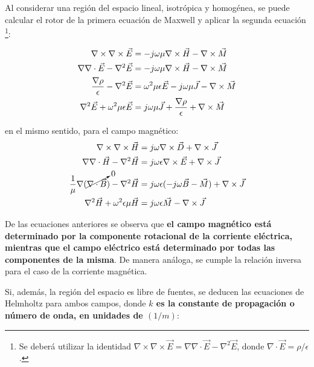 Al considerar una región del espacio lineal, isotrópica y homogénea, se puede calcular el rotor de la primera ecuación de Maxwell y aplicar la segunda ecuación \footnote{Se deberá utilizar la identidad $\nabla \times \nabla \times \vec{E} = \nabla \nabla \cdot \vec{E} - \nabla^2\vec{E}$, donde $\nabla \cdot \vec{E} = \rho/\epsilon$.}:

\begin{align}
	\nabla \times \nabla \times \vec{E} & = -j \omega \mu \nabla \times \vec{H} - \nabla \times \vec{M} \notag \\
	\nabla \nabla \cdot \vec{E} - \nabla^2 \vec{E} & = -j \omega \mu \nabla \times \vec{H} - \nabla \times \vec{M} \notag \\
	\frac{\nabla \rho}{\epsilon} - \nabla^2 \vec{E} & = \omega^2 \mu \epsilon \vec{E} - j \omega \mu \vec{J} - \nabla \times \vec{M} \notag\\
	\nabla^2 \vec{E} + \omega^2 \mu \epsilon \vec{E} & = j \omega \mu \vec{J} + \frac{\nabla \rho}{\epsilon} + \nabla \times \vec{M}
	\label{eq:eq_ondas_completa_E}
\end{align}

en el mismo sentido, para el campo magnético:
\begin{align}
	\nabla \times \nabla \times \vec{H} & = j \omega \nabla \times \vec{D} +  \nabla \times \vec{J} \notag \\
	\nabla \nabla \cdot \vec{H} - \nabla^2 \vec{H} & = j \omega \epsilon \nabla \times \vec{E} + \nabla \times \vec{J} \notag \\
	\frac{1}{\mu} \nabla (\cancelto{0}{\nabla \cdot \vec{B}}) - \nabla^2 \vec{H} & = j \omega \epsilon (-j \omega \vec{B} - \vec{M}) + \nabla \times \vec{J} \notag \\
	\nabla^2 \vec{H} + \omega^2 \epsilon \mu \vec{H} & =  j \omega \epsilon \vec{M} - \nabla \times \vec{J}
	\label{eq:eq_ondas_completa_H}
\end{align}

De las ecuaciones anteriores se observa que \textbf{el campo magnético está determinado por la componente rotacional de la corriente eléctrica, mientras que el campo eléctrico está determinado por todas las componentes de la misma}. De manera análoga, se cumple la relación inversa para el caso de la corriente magnética.

Si, además, la región del espacio es libre de fuentes, se deducen las ecuaciones de Helmholtz para ambos campos, donde \textbf{$k$ es la constante de propagación o número de onda, en unidades de $(1/m)$}:

